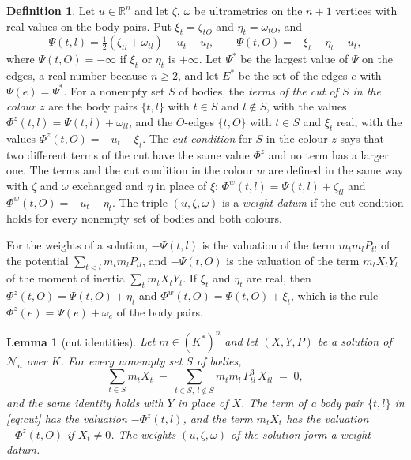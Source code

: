 \documentclass[11pt]{amsart}
\newtheorem{lemma}[theorem]{Lemma}
\theoremstyle{definition}
\newtheorem{definition}[theorem]{Definition}
\theoremstyle{remark}
\numberwithin{equation}{section}
\newcommand{\RR}{\mathbb{R}}
\newcommand{\cN}{\mathcal{N}}
\newcommand{\Ps}{\Psi^{*}}
\newcommand{\Es}{E^{*}}
\begin{document}
\begin{definition}\label{def:psi}
Let $u \in \RR^n$ and let $\zeta$, $\omega$ be ultrametrics on the $n + 1$ vertices with real values on
the body pairs. Put $\xi_t = \zeta_{tO}$ and $\eta_t = \omega_{tO}$, and
\[
  \Psi(t, l) = \tfrac12 (\zeta_{tl} + \omega_{tl}) - u_t - u_l, \qquad
  \Psi(t, O) = -\xi_t - \eta_t - u_t ,
\]
where $\Psi(t, O) = -\infty$ if $\xi_t$ or $\eta_t$ is $+\infty$. Let $\Ps$ be the largest value of
$\Psi$ on the edges, a real number because $n \ge 2$, and let $\Es$ be the set of the edges $e$ with
$\Psi(e) = \Ps$. For a nonempty set $S$ of bodies, the \emph{terms of the cut of $S$ in the colour $z$}
are the body pairs $\{t, l\}$ with $t \in S$ and $l \notin S$, with the values
$\Phi^z(t, l) = \Psi(t, l) + \omega_{tl}$, and the $O$-edges $\{t, O\}$ with $t \in S$ and $\xi_t$ real,
with the values $\Phi^z(t, O) = -u_t - \xi_t$. The \emph{cut condition} for $S$ in the colour $z$ says
that two different terms of the cut have the same value $\Phi^z$ and no term has a larger one. The terms
and the cut condition in the colour $w$ are defined in the same way with $\zeta$ and $\omega$ exchanged
and $\eta$ in place of $\xi$: $\Phi^w(t, l) = \Psi(t, l) + \zeta_{tl}$ and $\Phi^w(t, O) = -u_t - \eta_t$.
The triple $(u, \zeta, \omega)$ is a \emph{weight datum} if the cut condition holds for every nonempty
set of bodies and both colours.
\end{definition}

For the weights of a solution, $-\Psi(t, l)$ is the valuation of the term $m_t m_l P_{tl}$ of the
potential $\sum_{t < l} m_t m_l P_{tl}$, and $-\Psi(t, O)$ is the valuation of the term $m_t X_t Y_t$ of
the moment of inertia $\sum_t m_t X_t Y_t$. If $\xi_t$ and $\eta_t$ are real, then
$\Phi^z(t, O) = \Psi(t, O) + \eta_t$ and $\Phi^w(t, O) = \Psi(t, O) + \xi_t$, which is the rule
$\Phi^z(e) = \Psi(e) + \omega_e$ of the body pairs.

\begin{lemma}[cut identities]\label{lem:A}
Let $m \in (K^{*})^n$ and let $(X, Y, P)$ be a solution of $\cN_n$ over $K$. For every nonempty set $S$
of bodies,
\begin{equation}\label{eq:cut}
  \sum_{t \in S} m_t X_t \;-\; \sum_{t \in S,\ l \notin S} m_t m_l\, P_{tl}^3\, X_{tl} \;=\; 0 ,
\end{equation}
and the same identity holds with $Y$ in place of $X$. The term of a body pair $\{t, l\}$ in
\eqref{eq:cut} has the valuation $-\Phi^z(t, l)$, and the term $m_t X_t$ has the valuation
$-\Phi^z(t, O)$ if $X_t \ne 0$. The weights $(u, \zeta, \omega)$ of the solution form a weight datum.
\end{lemma}
\end{document}
